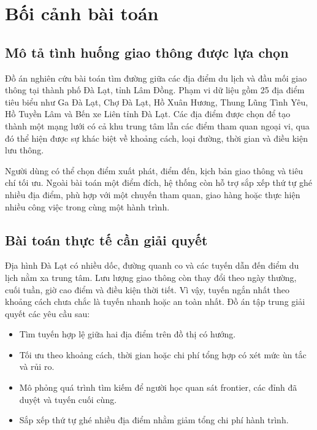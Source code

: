 
\chapter{Bối cảnh bài toán}
\label{chap:problem-context}

\section{Mô tả tình huống giao thông được lựa chọn}

Đồ án nghiên cứu bài toán tìm đường giữa các địa điểm du lịch và đầu mối giao
thông tại thành phố Đà Lạt, tỉnh Lâm Đồng. Phạm vi dữ liệu gồm 25 địa điểm tiêu
biểu như Ga Đà Lạt, Chợ Đà Lạt, Hồ Xuân Hương, Thung Lũng Tình Yêu, Hồ Tuyền
Lâm và Bến xe Liên tỉnh Đà Lạt. Các địa điểm được chọn để tạo thành một mạng
lưới có cả khu trung tâm lẫn các điểm tham quan ngoại vi, qua đó thể hiện được
sự khác biệt về khoảng cách, loại đường, thời gian và điều kiện lưu thông.

Người dùng có thể chọn điểm xuất phát, điểm đến, kịch bản giao thông và tiêu
chí tối ưu. Ngoài bài toán một điểm đích, hệ thống còn hỗ trợ sắp xếp thứ tự
ghé nhiều địa điểm, phù hợp với một chuyến tham quan, giao hàng hoặc thực hiện
nhiều công việc trong cùng một hành trình.

\section{Bài toán thực tế cần giải quyết}

Địa hình Đà Lạt có nhiều dốc, đường quanh co và các tuyến dẫn đến điểm du lịch
nằm xa trung tâm. Lưu lượng giao thông còn thay đổi theo ngày thường, cuối
tuần, giờ cao điểm và điều kiện thời tiết. Vì vậy, tuyến ngắn nhất theo khoảng
cách chưa chắc là tuyến nhanh hoặc an toàn nhất. Đồ án tập trung giải quyết các
yêu cầu sau:

\begin{itemize}[itemsep=2pt]
  \item Tìm tuyến hợp lệ giữa hai địa điểm trên đồ thị có hướng.
  \item Tối ưu theo khoảng cách, thời gian hoặc chi phí tổng hợp có xét mức ùn
  tắc và rủi ro.
  \item Mô phỏng quá trình tìm kiếm để người học quan sát frontier, các đỉnh đã
  duyệt và tuyến cuối cùng.
  \item Sắp xếp thứ tự ghé nhiều địa điểm nhằm giảm tổng chi phí hành trình.
\end{itemize}

